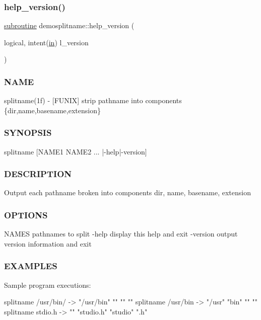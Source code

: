 \subsubsection{\texorpdfstring{help\+\_\+version()}{help\_version()}}
{\footnotesize\ttfamily \hyperlink{M__stopwatch_83_8txt_acfbcff50169d691ff02d4a123ed70482}{subroutine} demosplitname\+::help\+\_\+version (\begin{DoxyParamCaption}\item[{logical, intent(\hyperlink{M__journal_83_8txt_afce72651d1eed785a2132bee863b2f38}{in})}]{l\+\_\+version }\end{DoxyParamCaption})}



\subsubsection*{N\+A\+ME}

splitname(1f) -\/ \mbox{[}F\+U\+N\+IX\mbox{]} strip pathname into components \{dir,name,basename,extension\} 

\subsubsection*{S\+Y\+N\+O\+P\+S\+IS}

\begin{DoxyVerb}splitname [NAME1 NAME2 ... |-help|-version]
\end{DoxyVerb}


\subsubsection*{D\+E\+S\+C\+R\+I\+P\+T\+I\+ON}

Output each pathname broken into components dir, name, basename, extension

\subsubsection*{O\+P\+T\+I\+O\+NS}

N\+A\+M\+ES pathnames to split -\/help display this help and exit -\/version output version information and exit

\subsubsection*{E\+X\+A\+M\+P\+L\+ES}

\begin{DoxyVerb}Sample program executions:

  splitname /usr/bin/          -> "/usr/bin" "" "" ""
  splitname /usr/bin           -> "/usr" "bin" "" ""
  splitname stdio.h            -> "" "studio.h" "studio" ".h"
\end{DoxyVerb}


